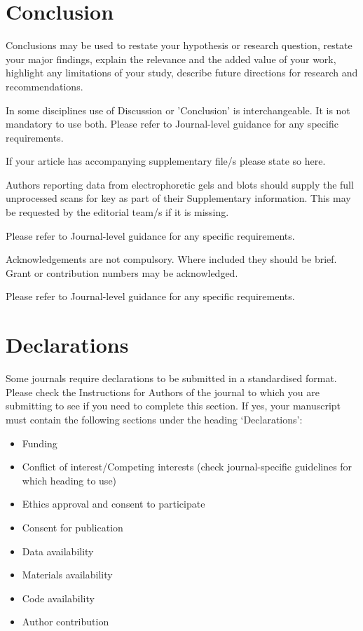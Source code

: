 \documentclass[lineno,pdflatex,sn-basic]{sn-jnl}%
\theoremstyle{thmstyleone}%
\theoremstyle{thmstyletwo}%
\theoremstyle{thmstylethree}%
\begin{document}
\section{Conclusion}\label{sec13}

Conclusions may be used to restate your hypothesis or research question, restate your major findings, explain the relevance and the added value of your work, highlight any limitations of your study, describe future directions for research and recommendations. 

In some disciplines use of Discussion or 'Conclusion' is interchangeable. It is not mandatory to use both. Please refer to Journal-level guidance for any specific requirements. 

\backmatter


If your article has accompanying supplementary file/s please state so here. 

Authors reporting data from electrophoretic gels and blots should supply the full unprocessed scans for key as part of their Supplementary information. This may be requested by the editorial team/s if it is missing.

Please refer to Journal-level guidance for any specific requirements.


Acknowledgements are not compulsory. Where included they should be brief. Grant or contribution numbers may be acknowledged.

Please refer to Journal-level guidance for any specific requirements.

\section*{Declarations}

Some journals require declarations to be submitted in a standardised format. Please check the Instructions for Authors of the journal to which you are submitting to see if you need to complete this section. If yes, your manuscript must contain the following sections under the heading `Declarations':

\begin{itemize}
\item Funding
\item Conflict of interest/Competing interests (check journal-specific guidelines for which heading to use)
\item Ethics approval and consent to participate
\item Consent for publication
\item Data availability 
\item Materials availability
\item Code availability 
\item Author contribution
\end{itemize}
\end{document}
